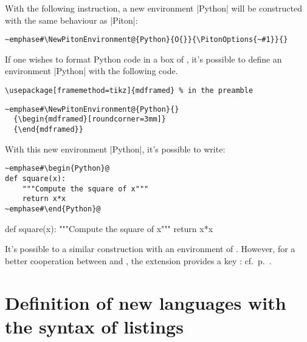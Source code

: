 \documentclass{article}
\begin{document}
\bigskip
With the following instruction, a new environment |{Python}| will be
constructed with the same behaviour as |{Piton}|:

\begin{Verbatim}
~emphase#\NewPitonEnvironment@{Python}{O{}}{\PitonOptions{~#1}}{} 
\end{Verbatim}

\bigskip
If one wishes to format Python code in a box of , it's possible
to define an environment |{Python}| with the following code.

\begin{footnotesize}
\begin{Verbatim}
\usepackage[framemethod=tikz]{mdframed} % in the preamble
\end{Verbatim}
\end{footnotesize}

\begin{Verbatim}
~emphase#\NewPitonEnvironment@{Python}{}
  {\begin{mdframed}[roundcorner=3mm]}
  {\end{mdframed}}
\end{Verbatim}

\bigskip
With this new environment |{Python}|, it's possible to write:

\begin{Verbatim}
~emphase#\begin{Python}@
def square(x):
    """Compute the square of x"""
    return x*x
~emphase#\end{Python}@
\end{Verbatim}

  {\begin{mdframed}[roundcorner=3mm]}
  {\end{mdframed}}

\begin{Python}
def square(x):
    """Compute the square of x"""
    return x*x
\end{Python}

\bigskip
It's possible to a similar construction with an environment of .
However, for a better cooperation between  and , the
extension  provides a key : cf.~p.~\pageref{tcolorbox}.


\section{Definition of new languages with the syntax of listings}
\end{document}
